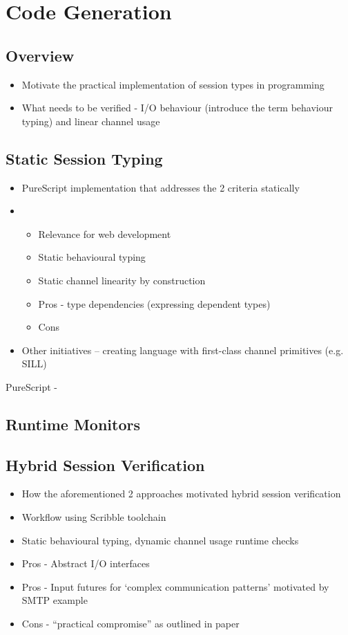 \section{Code Generation}

\subsection{Overview}
\begin{itemize}
\item Motivate the practical implementation of session types in programming
\item What needs to be verified - I/O behaviour (introduce the term behaviour typing) and linear channel usage
\end{itemize}

\subsection{Static Session Typing}
\begin{itemize}
\item PureScript implementation that addresses the 2 criteria statically
\item \begin{itemize}
\item Relevance for web development
\item Static behavioural typing
\item Static channel linearity by construction
\item Pros - type dependencies (expressing dependent types)
\item Cons
\end{itemize}
\item Other initiatives -- creating language with first-class channel primitives (e.g. SILL)
\end{itemize}

PureScript - \cite{PS2019}

\subsection{Runtime Monitors}

\subsection{Hybrid Session Verification}
\begin{itemize}
\item How the aforementioned 2 approaches motivated hybrid session verification
\item Workflow using Scribble toolchain 
\item Static behavioural typing, dynamic channel usage runtime checks
\item Pros - Abstract I/O interfaces
\item Pros - Input futures for `complex communication patterns' motivated by SMTP example
\item Cons - ``practical compromise'' as outlined in paper
\end{itemize}

